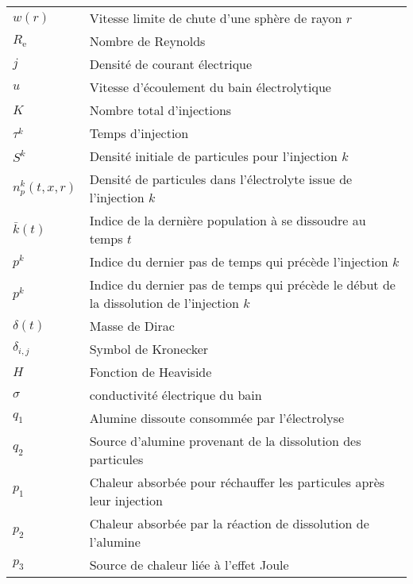 \begin{tabularx}{\textwidth}{@{}ll@{}}
  $w(r)$ & Vitesse limite de chute d'une sphère de rayon $r$\\
  $R_\mathrm{e}$ & Nombre de Reynolds \\
  $j$ & Densité de courant électrique \\
  $u$ & Vitesse d'écoulement du bain électrolytique \\
  $K$ & Nombre total d'injections \\
  $\tau^k$ & Temps d'injection \\
  $S^k$ & Densité initiale de particules pour l'injection $k$ \\
  $n_p^k(t, x, r)$ & Densité de particules dans l'électrolyte issue de l'injection $k$\\
  $\bar{k}(t)$ & Indice de la dernière population à se dissoudre au temps $t$ \\
  $p^k$ & Indice du dernier pas de temps qui précède l'injection $k$\\
  $p^k$ & Indice du dernier pas de temps qui précède le début de la dissolution de l'injection $k$\\
  $\delta(t)$ & Masse de Dirac \\
  $\delta_{i,j}$ & Symbol de Kronecker \\
  $H$ & Fonction de Heaviside \\
  $\sigma$ & conductivité électrique du bain\\
  $q_1$ & Alumine dissoute consommée par l'électrolyse\\
  $q_2$ & Source d'alumine provenant de la dissolution des particules\\
  $p_1$ & Chaleur absorbée pour réchauffer les particules après leur injection\\
  $p_2$ & Chaleur absorbée par la réaction de dissolution de l'alumine\\
  $p_3$ & Source de chaleur liée à l'effet Joule\\
  \bottomrule
\end{tabularx}

